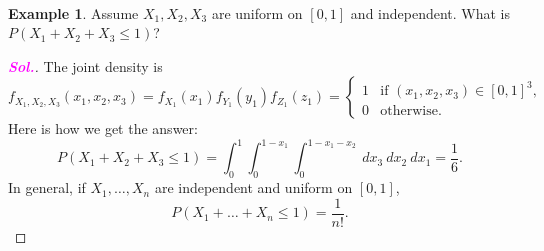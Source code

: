 \documentclass[12pt,a4paper]{article}
\theoremstyle{definition}
\newtheorem{example}{Example}[section]
\theoremstyle{definition}
\theoremstyle{definition}
\theoremstyle{definition}
\theoremstyle{remark}
\theoremstyle{definition}
\newcommand{\sol}{\textcolor{magenta}{\bf \textit{Sol.}}\quad}
\begin{document}
\
\begin{example}
	Assume $X_1, X_2, X_3$ are uniform on $[0,1]$ and independent. What is $P(X_1+X_2+X_3\leq 1)$?\begin{proof}[\sol]
		The joint density is \[
		f_{X_1,X_2,X_3}(x_1,x_2,x_3)=f_{X_1}(x_1)f_{Y_1}(y_1)f_{Z_1}(z_1)=\begin{cases}
		1 &\text{if $(x_1,x_2,x_3)\in[0,1]^3$},\\
		0 &\text{otherwise}.
		\end{cases}
		\] Here is how we get the answer: \[
		P(X_1+X_2+X_3\leq 1)=\int_0^1\int_0^{1-x_1}\int_0^{1-x_1-x_2}\ dx_3\ dx_2\ dx_1=\frac{1}{6}.
		\] In general, if $X_1,\dots, X_n$ are independent and uniform on $[0,1]$, \[
		P(X_1+\dots+X_n\leq 1)=\frac{1}{n!}.
		\]
	\end{proof}
\end{example}
\
\end{document}
